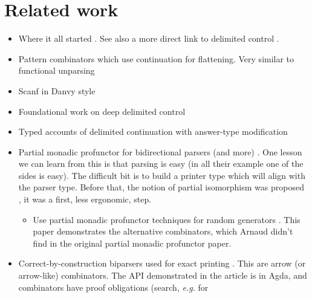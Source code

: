 \documentclass[sigplan,review,dvipsnames,screen,10pt]{acmart}
\begin{document}

\maketitle

\section{Related work}

\begin{itemize}
\item Where it all started \cite{functional-unparsing}. See also a
  more direct link to delimited control
  \cite{typed-functional-unparsing}.
\item Pattern combinators which use continuation for flattening. Very
  similar to functional unparsing \cite{pattern-combinators}
\item Scanf in Danvy style \cite{functional-ununparsing}
\item Foundational work on deep delimited control \cite{shift0}
\item Typed accounts of delimited continuation with answer-type
  modification \cite{polymorphic-conts,substructural-delimcc}
\item Partial monadic profunctor for bidirectional parsers (and more)
  \cite{monadic-profunctors}. One lesson we can learn from this is
  that parsing is easy (in all their example one of the sides is
  easy). The difficult bit is to build a printer type which will align
  with the parser type. Before that, the notion of partial isomorphism
  was proposed \cite{partial-isomorphism}, it was a first, less
  ergonomic, step.
  \begin{itemize}
  \item Use partial monadic profunctor techniques for random
    generators \cite{reflect-random}. This paper demonstrates the
    alternative combinators, which Arnaud didn't find in the original
    partial monadic profunctor paper.
  \end{itemize}
\item Correct-by-construction biparsers used for exact printing
  \cite{biparser-exact-print}. This are arrow (or arrow-like)
  combinators. The API demonstrated in the article is in Agda, and
  combinators have proof obligations (search, \emph{e.g.} for

\end{itemize}
\end{document}
